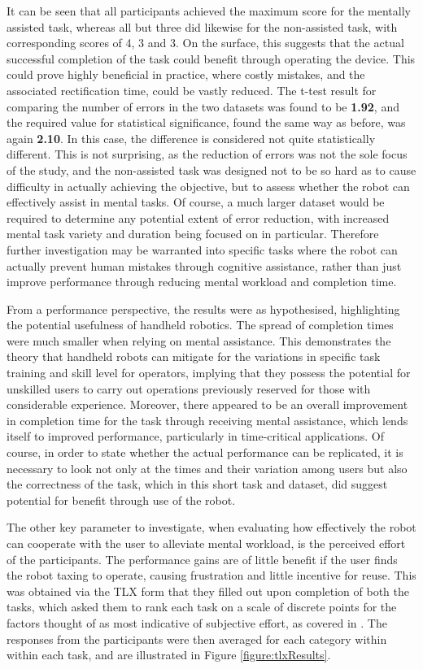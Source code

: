 \documentclass[11pt]{article}
\begin{document}
It can be seen that all participants achieved the maximum score for the mentally assisted task, whereas all but three did likewise for the non-assisted task, with corresponding scores of 4, 3 and 3. On the surface, this suggests that the actual successful completion of the task could benefit through operating the device. This could prove highly beneficial in practice, where costly mistakes, and the associated rectification time, could be vastly reduced. The t-test result for comparing the number of errors in the two datasets was found to be \textbf{1.92}, and the required value for statistical significance, found the same way as before, was again \textbf{2.10}. In this case, the difference is considered not quite statistically different. This is not surprising, as the reduction of errors was not the sole focus of the study, and the non-assisted task was designed not to be so hard as to cause difficulty in actually achieving the objective, but to assess whether the robot can effectively assist in mental tasks. Of course, a much larger dataset would be required to determine any potential extent of error reduction, with increased mental task variety and duration being focused on in particular. Therefore further investigation may be warranted into specific tasks where the robot can actually prevent human mistakes through cognitive assistance, rather than just improve performance through reducing mental workload and completion time.


From a performance perspective, the results were as hypothesised, highlighting the potential usefulness of handheld robotics. The spread of completion times were much smaller when relying on mental assistance. This demonstrates the theory that handheld robots can mitigate for the variations in specific task training and skill level for operators, implying that they possess the potential for unskilled users to carry out operations previously reserved for those with considerable experience. Moreover, there appeared to be an overall improvement in completion time for the task through receiving mental assistance, which lends itself to improved performance, particularly in time-critical applications. Of course, in order to state whether the actual performance can be replicated, it is necessary to look not only at the times and their variation among users but also the correctness of the task, which in this short task and dataset, did suggest potential for benefit through use of the robot.


The other key parameter to investigate, when evaluating how effectively the robot can cooperate with the user to alleviate mental workload, is the perceived effort of the participants. The performance gains are of little benefit if the user finds the robot taxing to operate, causing frustration and little incentive for reuse. This was obtained via the TLX form that they filled out upon completion of both the tasks, which asked them to rank each task on a scale of discrete points for the factors thought of as most indicative of subjective effort, as covered in \cite{hart1988}. The responses from the participants were then averaged for each category within within each task, and are illustrated in Figure \ref{figure:tlxResults}.
\end{document}
